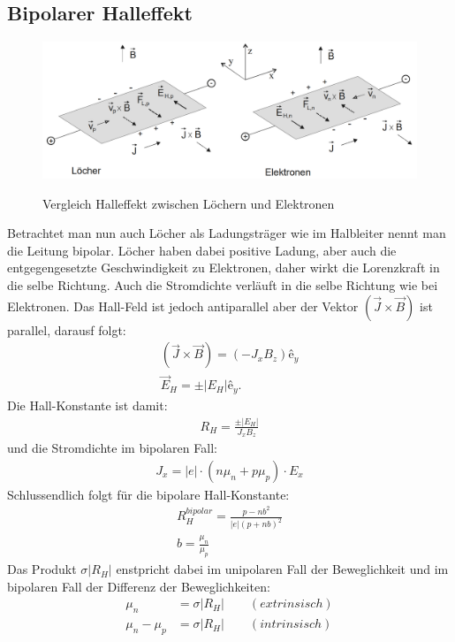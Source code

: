 \subsection{Bipolarer Halleffekt}
\begin{figure}
    \centering
    \caption{Vergleich Halleffekt zwischen Löchern und Elektronen}
    \includegraphics[width=1.0\textwidth]{./fig/bipo_hall.png}
    \label{fig:bihl}
\end{figure}
Betrachtet man nun auch Löcher als Ladungsträger wie im Halbleiter nennt man die Leitung bipolar. Löcher haben dabei positive Ladung, aber auch die entgegengesetzte Geschwindigkeit zu Elektronen, daher wirkt die Lorenzkraft in die selbe Richtung. Auch die Stromdichte verläuft in die selbe Richtung wie bei Elektronen. Das Hall-Feld ist jedoch antiparallel aber der Vektor $( \Vec{J} \times \Vec{B} )$ ist parallel, darausf folgt:
\begin{align}
    ( \Vec{J} \times \Vec{B} ) = (-J_x B_z) ê_y \\
    \Vec{E}_H = \pm |E_H| ê_y.
\end{align}
Die Hall-Konstante ist damit:
\begin{align}
    R_H = \frac{\pm|E_H|}{J_xB_z}
\end{align}
und die Stromdichte im bipolaren Fall:
\begin{align}
    J_x = |e| \cdot (n\mu_n+p\mu_p) \cdot E_x
\end{align}
Schlussendlich folgt für die bipolare Hall-Konstante:
\begin{align}
    R_H^{bipolar} = \frac{p-nb^2}{|e|(p+nb)^2} \\
    b= \frac{\mu_n}{\mu_p}
\end{align}
Das Produkt $\sigma |R_H|$ enstpricht dabei im unipolaren Fall der Beweglichkeit und im bipolaren Fall der Differenz der Beweglichkeiten:
\begin{align}
    \mu_n &= \sigma |R_H| \qquad (extrinsisch) \\
    \mu_n - \mu_p &= \sigma |R_H| \qquad (intrinsisch)
\end{align}